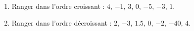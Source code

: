 
\begin{exercice}\label{exo2smath-0050}

    \begin{enumerate}
        \item
            Ranger dans l'ordre croissant : \( 4\), \( -1\), \( 3\), \( 0\), \( -5\), \( -3\), \( 1\).
        \item
            Ranger dans l'ordre décroissant : \( 2\), \( -3\), \( 1.5\), \( 0\), \( -2\), \( -40\), \( 4\).
    \end{enumerate}

\end{exercice}
